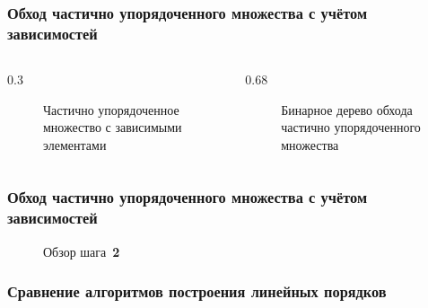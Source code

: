 \begin{frame}
  \frametitle{Обход частично упорядоченного множества с учётом зависимостей}

  \begin{columns}[T]
    \begin{column}{0.3\textwidth}
      \begin{figure}
        \scalebox{0.6}{}
        \caption{Частично упорядоченное множество с зависимыми элементами}
        \label{fig:topo-dep}
      \end{figure}
    \end{column}
    \begin{column}{0.68\textwidth}
      \begin{figure}
        \scalebox{0.7}{}
        \caption{Бинарное дерево обхода частично упорядоченного множества}
        \label{fig:topo-dep-tree}
      \end{figure}
    \end{column}

  \end{columns}


\end{frame}

\begin{frame}
  \frametitle{Обход частично упорядоченного множества с учётом зависимостей}

  \begin{figure}
    \scalebox{0.6}{}
    \caption{Обзор шага~\textbf{2}}
    \label{fig:detail-traversal-for-step2}
  \end{figure}

\end{frame}

\begin{frame}
  \frametitle{Сравнение алгоритмов построения линейных порядков}
  \centering
  \scalebox{0.8}{}
  \label{fig:nds-13-linext}
\end{frame}

